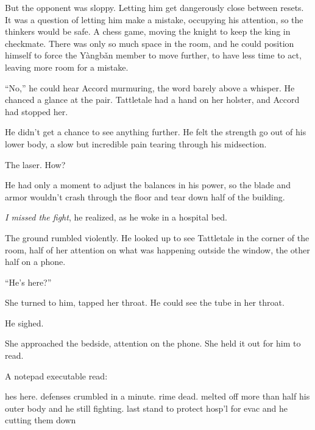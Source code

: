 But the opponent was sloppy.  Letting him get dangerously close between resets.  It was a question of letting him make a mistake, occupying his attention, so the thinkers would be safe.  A chess game, moving the knight to keep the king in checkmate.  There was only so much space in the room, and he could position himself to force the Y\`{a}ngb\v{a}n member to move further, to have less time to act, leaving more room for a mistake.



``No,'' he could hear Accord murmuring, the word barely above a whisper.  He chanced a glance at the pair.  Tattletale had a hand on her holster, and Accord had stopped her.



He didn't get a chance to see anything further.  He felt the strength go out of his lower body, a slow but incredible pain tearing through his midsection.



The laser.  How?



He had only a moment to adjust the balances in his power, so the blade and armor wouldn't crash through the floor and tear down half of the building.



\blacksquare



\emph{I missed the fight}, he realized, as he woke in a hospital bed.



The ground rumbled violently.  He looked up to see Tattletale in the corner of the room, half of her attention on what was happening outside the window, the other half on a phone.



``He's here?''



She turned to him, tapped her throat.  He could see the tube in her throat.



He sighed.



She approached the bedside, attention on the phone.  She held it out for him to read.



A notepad executable read:



hes here.  defenses crumbled in a minute.  rime dead.  melted off more than half his outer body and he still fighting.  last stand to protect hosp'l for evac and he cutting them down



